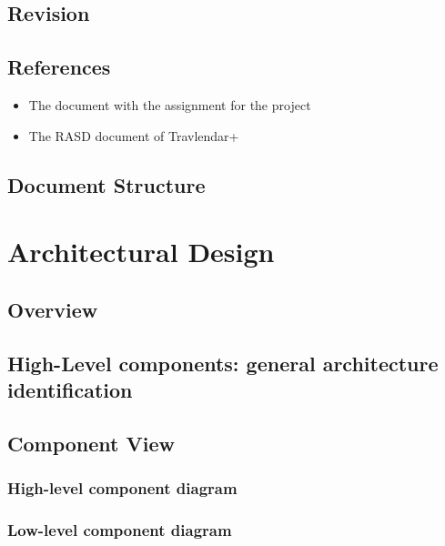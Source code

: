\documentclass{article}
\begin{document}
\subsection{Revision}




\subsection{References}
\begin{itemize}
	\item The document with the assignment for the project
	\item The RASD document of Travlendar+
\end{itemize}
\subsection{Document Structure}


\clearpage
\section{Architectural Design}

\subsection{Overview}\label{overview}


\clearpage
\subsection{High-Level components: general architecture identification}\label{higharch}


\clearpage

\subsection{Component View}\label{componentview}

\clearpage
\subsubsection{High-level component diagram}

\clearpage
\subsubsection{Low-level component diagram}

\clearpage

\clearpage
\end{document}
